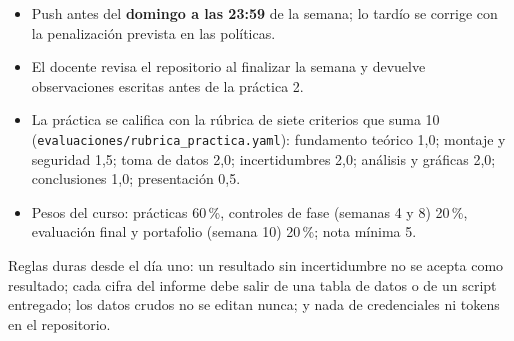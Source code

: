\documentclass[11pt,a4paper]{article}
\begin{document}
\begin{itemize}[leftmargin=1.4em,itemsep=2pt,topsep=3pt]
  \item Push antes del \textbf{domingo a las 23:59} de la semana; lo tardío se corrige con la penalización prevista en las políticas.
  \item El docente revisa el repositorio al finalizar la semana y devuelve observaciones escritas antes de la práctica 2.
  \item La práctica se califica con la rúbrica de siete criterios que suma 10 (\texttt{evaluaciones/rubrica\_practica.yaml}): fundamento teórico 1,0; montaje y seguridad 1,5; toma de datos 2,0; incertidumbres 2,0; análisis y gráficas 2,0; conclusiones 1,0; presentación 0,5.
  \item Pesos del curso: prácticas 60\,\%, controles de fase (semanas 4 y 8) 20\,\%, evaluación final y portafolio (semana 10) 20\,\%; nota mínima 5.
\end{itemize}

\begin{cajaReto}Reglas duras desde el día uno: un resultado sin incertidumbre no se acepta como resultado; cada cifra del informe debe salir de una tabla de datos o de un script entregado; los datos crudos no se editan nunca; y nada de credenciales ni tokens en el repositorio.\end{cajaReto}
\end{document}
